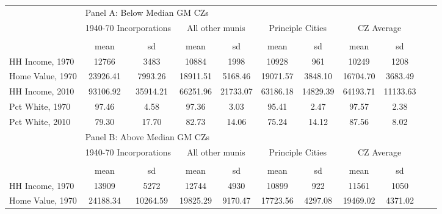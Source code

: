 \begin{tabular}{l*{10}{c}} \toprule
&\multicolumn{8}{l}{Panel A: Below Median GM CZs}\\
\cmidrule(lr){1-9}
&\multicolumn{2}{c}{1940-70 Incorporations}&\multicolumn{2}{c}{All other munis}&\multicolumn{2}{c}{Principle Cities}&\multicolumn{2}{c}{CZ Average}\\ \cmidrule(lr){2-3}  \cmidrule(lr){4-5} \cmidrule(lr){6-7} \cmidrule(lr){8-9}
                    &\multicolumn{2}{c}{}     &\multicolumn{2}{c}{}     &\multicolumn{2}{c}{}     &\multicolumn{2}{c}{}     \\
                    &        mean&          sd&        mean&          sd&        mean&          sd&        mean&          sd\\
\midrule
HH Income, 1970     &       12766&        3483&       10884&        1998&       10928&         961&       10249&        1208\\
Home Value, 1970    &    23926.41&     7993.26&    18911.51&     5168.46&    19071.57&     3848.10&    16704.70&     3683.49\\
HH Income, 2010     &    93106.92&    35914.21&    66251.96&    21733.07&    63186.18&    14829.39&    64193.71&    11133.63\\
Pct White, 1970     &       97.46&        4.58&       97.36&        3.03&       95.41&        2.47&       97.57&        2.38\\
Pct White, 2010     &       79.30&       17.70&       82.73&       14.06&       75.24&       14.12&       87.56&        8.02\\
 \toprule
&\multicolumn{8}{l}{Panel B: Above Median GM CZs}\\
\cmidrule(lr){1-9}
&\multicolumn{2}{c}{1940-70 Incorporations}&\multicolumn{2}{c}{All other munis}&\multicolumn{2}{c}{Principle Cities}&\multicolumn{2}{c}{CZ Average}\\ \cmidrule(lr){2-3}  \cmidrule(lr){4-5} \cmidrule(lr){6-7} \cmidrule(lr){8-9}
                    &\multicolumn{2}{c}{}     &\multicolumn{2}{c}{}     &\multicolumn{2}{c}{}     &\multicolumn{2}{c}{}     \\
                    &        mean&          sd&        mean&          sd&        mean&          sd&        mean&          sd\\
\midrule
HH Income, 1970     &       13909&        5272&       12744&        4930&       10899&         922&       11561&        1050\\
Home Value, 1970    &    24188.34&    10264.59&    19825.29&     9170.47&    17723.56&     4297.08&    19469.02&     4371.02\\

\end{tabular}
